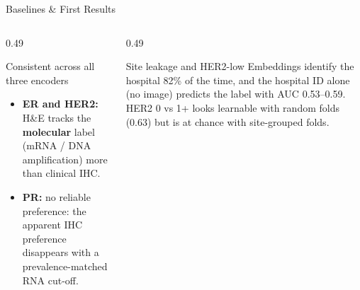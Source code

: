 \documentclass[aspectratio=169,10pt]{beamer}
\begin{document}
\begin{frame}[t]{Baselines \& First Results}
\vspace{3pt}
\raggedright
\begin{columns}[T]
\begin{column}{0.49\textwidth}
\begin{block}{Consistent across all three encoders}
\begin{itemize}
  \item \textbf{ER and HER2:} H\&E tracks the \textbf{molecular} label (mRNA / DNA amplification) more than clinical IHC.
  \item \textbf{PR:} no reliable preference: the apparent IHC preference disappears with a prevalence-matched RNA cut-off.
\end{itemize}
\end{block}
\end{column}
\begin{column}{0.49\textwidth}
\begin{alertblock}{Site leakage and HER2-low}
Embeddings identify the hospital 82\% of the time, and the hospital ID alone (no image) predicts the label with
AUC 0.53--0.59. HER2 0 vs 1+ looks learnable with random folds (0.63) but is at chance with site-grouped folds.
\end{alertblock}
\end{column}
\end{columns}
\end{frame}
\end{document}
